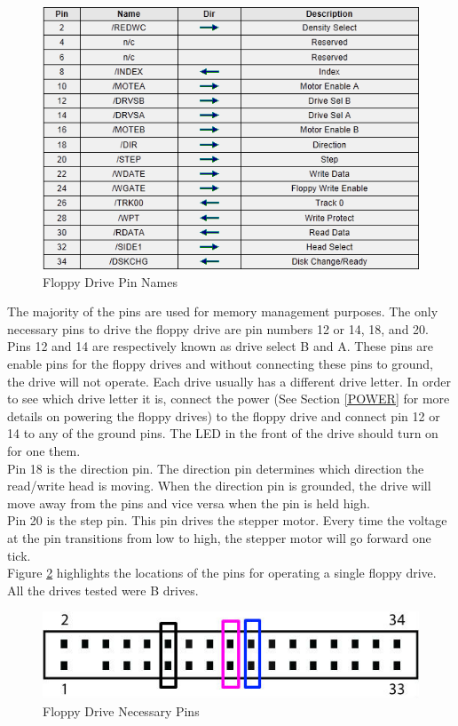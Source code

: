 \documentclass[11pt, a4paper]{report}
\begin{document}
\begin{figure}[H]
\hspace*{-2cm}    
    \centering
    \includegraphics[width=.75\textwidth]{pinNames.png}
    \caption{Floppy Drive Pin Names}
    \label{fig:pinNames}
\end{figure}
 
The majority of the pins are used for memory management purposes. The only necessary pins to drive the floppy drive are pin numbers 12 or 14, 18, and 20.\\

Pins 12 and 14 are respectively known as drive select B and A. These pins are enable pins for the floppy drives and without connecting these pins to ground, the drive will not operate. Each drive usually has a different drive letter. In order to see which drive letter it is, connect the power (See Section \ref{POWER} for more details on powering the floppy drives) to the floppy drive and connect pin 12 or 14 to any of the ground pins. The LED in the front of the drive should turn on for one them. \\

Pin 18 is the direction pin. The direction pin determines which direction the read/write head is moving. When the direction pin is grounded, the drive will move away from the pins and vice versa when the pin is held high. \\

Pin 20 is the step pin. This pin drives the stepper motor. Every time the voltage at the pin transitions from low to high, the stepper motor will go forward one tick.\\

Figure \ref{fig:pins} highlights the locations of the pins for operating a single floppy drive. All the drives tested were B drives.

\begin{figure}[H]
\hspace*{-2cm}    
    \centering
    \includegraphics[width=.75\textwidth]{floppy_pinoutV1.jpg}
    \caption{Floppy Drive Necessary Pins}
    \label{fig:pins}
\end{figure}
\end{document}
